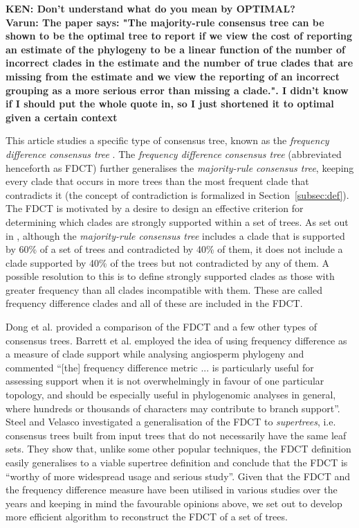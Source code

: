 \documentclass[final,1p,times]{elsarticle}
\begin{document}
    {\bf KEN: Don't understand what do you mean by OPTIMAL?}\\
	{\bf Varun: The paper says: "The majority-rule consensus tree can be shown to be the optimal tree to report if we view the cost of reporting an estimate of the phylogeny to be a linear function of the number of incorrect clades in the estimate and the number of true clades that are missing from the estimate and we view the reporting of an incorrect grouping as a more serious error than missing a clade.". I didn't know if I should put the whole quote in, so I just shortened it to optimal given a certain context}

    This article studies a specific type of consensus tree, known as the \textit{frequency difference consensus tree} \cite{goloboff2003improvements}. The \textit{frequency difference consensus tree} (abbreviated henceforth as FDCT) further generalises the \textit{majority-rule consensus tree}, keeping every clade that occurs in more trees than the most frequent clade that contradicts it (the concept of contradiction is formalized in Section~\ref{subsec:def}). The FDCT is motivated by a desire to design an effective criterion for determining which clades are strongly supported within a set of trees. As set out in \cite{goloboff2003improvements}, although the \textit{majority-rule consensus tree} includes a clade that is supported by 60\% of a set of trees and contradicted by 40\% of them, it does not include a clade supported by 40\% of the trees but not contradicted by any of them. A possible resolution to this is to define strongly supported clades as those with greater frequency than all clades incompatible with them. These are called frequency difference clades and all of these are included in the FDCT.

    Dong et al. \cite{dong2010majority} provided a comparison of the FDCT and a few other types of consensus trees. Barrett et al. \cite{barrett2013plastid} employed the idea of using frequency difference as a measure of clade support while analysing angiosperm phylogeny and commented ``[the] frequency difference metric ... is particularly useful for assessing support when it is not overwhelmingly in favour of one particular topology, and should be especially useful in phylogenomic analyses in general, where hundreds or thousands of characters may contribute to branch support''. Steel and Velasco \cite{steel2014axiomatic} investigated a generalisation of the FDCT to \textit{supertrees}, i.e. consensus trees built from input trees that do not necessarily have the same leaf sets. They show that, unlike some other popular techniques, the FDCT definition easily generalises to a viable supertree definition and conclude that the FDCT is ``worthy of more widespread usage and serious study''. Given that the FDCT and the frequency difference measure have been utilised in various studies over the years \cite{garcia2014testing,barrett2013plastid,molineri2010cladistic,molineri2013phylogeny,molineri2015phylogeny,lindqvist2006molecular,han2014new} and keeping in mind the favourable opinions above, we set out to develop more efficient algorithm to reconstruct the FDCT of a set of trees.
\end{document}
